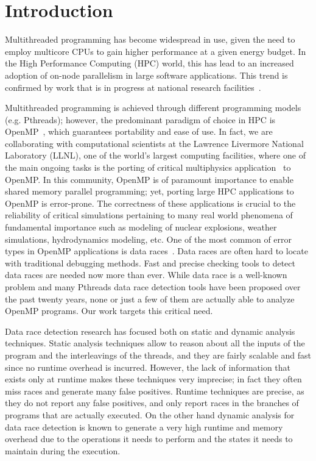 \section{Introduction}
\label{sec:introduction}

Multithreaded programming has become widespread in use, given the need to
employ multicore CPUs to gain higher performance at a given energy budget.
%
In the High Performance Computing (HPC) world, this has lead to an increased
adoption of on-node parallelism in large software applications.
%
This trend is confirmed by work that is in progress at national research
facilities~\cite{sierra, summit, trinity}.

Multithreaded programming is achieved through different programming models
(e.g. Pthreads); however, the predominant paradigm of choice in HPC is
OpenMP~\cite{ompdoc}, which guarantees portability and ease of use.
%
In fact, we are collaborating with computational scientists at the Lawrence
Livermore National Laboratory (LLNL), one of the world's largest computing
facilities, where one of the main ongoing tasks is the porting of critical
multiphysics application~\cite{llnl-apps} to OpenMP.
%
In this community, OpenMP is of paramount importance to enable shared memory
parallel programming; yet, porting large HPC applications to OpenMP is
error-prone.
%
The correctness of these applications is crucial to the reliability of
critical simulations pertaining to many real world phenomena of fundamental
importance such as modeling of nuclear explosions, weather simulations,
hydrodynamics modeling, etc.
%
One of the most common of error types in OpenMP applications is data
races~\cite{sus_common_2008}.
%
Data races are often hard to locate with traditional debugging methods.
%
Fast and precise checking tools to detect data races are needed now more than
ever.
%
While data race is a well-known problem and many Pthreads data race detection
tools have been proposed over the past twenty years, none or just a few of
them are actually able to analyze OpenMP programs.
%
Our work targets this critical need.

Data race detection research has focused both on static and dynamic analysis
techniques.
%
Static analysis techniques allow to reason about all the inputs of the program
and the interleavings of the threads, and they are fairly scalable and fast
since no runtime overhead is incurred.
%
However, the lack of information that exists only at runtime makes these
techniques very imprecise; in fact they often miss races and generate many
false positives.
%
Runtime techniques are precise, as they do not report any false positives, and
only report races in the branches of programs that are actually executed.
%
On the other hand dynamic analysis for data race detection is known to
generate a very high runtime and memory overhead due to the operations it
needs to perform and the states it needs to maintain during the execution.


